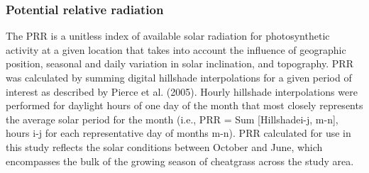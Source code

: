 \def\year{2017}\relax \documentclass[letterpaper]{article}
\begin{document}
\subsubsection{Potential relative radiation}
 The PRR is a unitless index of available solar radiation for photosynthetic activity at a given location that takes into account the influence of geographic position, seasonal and daily variation in solar inclination, and topography. PRR was calculated by summing digital hillshade interpolations for a given period of interest as described by Pierce et al. (2005). Hourly hillshade interpolations were performed for daylight hours of one day of the month that most closely represents the average solar period for the month (i.e., PRR = Sum [Hillshadei-j, m-n], hours i-j for each representative day of months m-n). PRR calculated for use in this study reflects the solar conditions between October and June, which encompasses the bulk of the growing season of cheatgrass across the study area.
\end{document}
